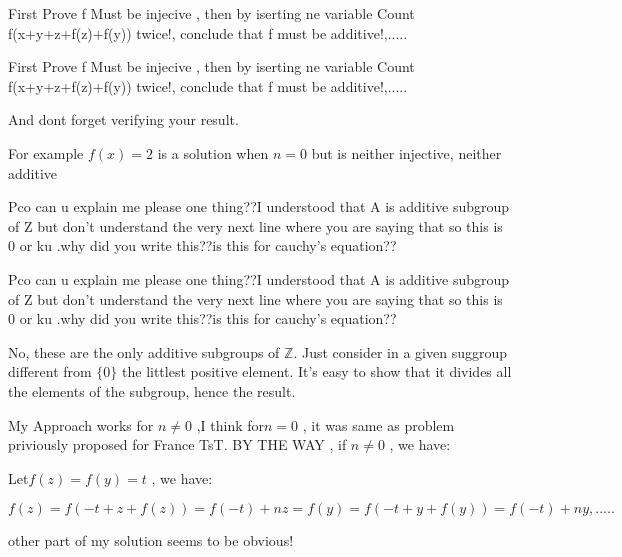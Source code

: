 \begin{solution}
	First Prove f Must be injecive , then by iserting ne variable  Count 
  f(x+y+z+f(z)+f(y)) twice!, conclude that f must be additive!,.....
\end{solution}



\begin{solution}
	\begin{tcolorbox}First Prove f Must be injecive , then by iserting ne variable  Count 
  f(x+y+z+f(z)+f(y)) twice!, conclude that f must be additive!,.....\end{tcolorbox}
And dont forget verifying your result.

For example $f(x)=2$ is a solution when $n=0$ but is neither injective, neither additive 
\end{solution}



\begin{solution}
	Pco can u explain me please one thing??I understood that A is additive subgroup of Z but don't understand the very next line where you are saying that so this is {0} or {ku} .why did you write this??is this for cauchy's equation??
\end{solution}



\begin{solution}
	\begin{tcolorbox}Pco can u explain me please one thing??I understood that A is additive subgroup of Z but don't understand the very next line where you are saying that so this is {0} or {ku} .why did you write this??is this for cauchy's equation??\end{tcolorbox}
No, these are the only additive subgroups of $\mathbb Z$. Just consider in a given suggroup different from $\{0\}$ the littlest positive element. It's easy to show that it divides all the elements of the subgroup, hence the result.
\end{solution}



\begin{solution}
	My Approach works for $n\ne{0} $ ,I think  for$ n=0$ , it was same as problem priviously proposed for France TsT. BY THE WAY , if $n\ne{0}$ , we have:

Let$ f(z)=f(y)=t$ , we have:
 
$f(z)=f(-t+z+f(z))=f(-t)+nz=f(y)=f(-t+y+f(y))=f(-t)+ny ,.....$

other part of my solution seems to be obvious!
\end{solution}



